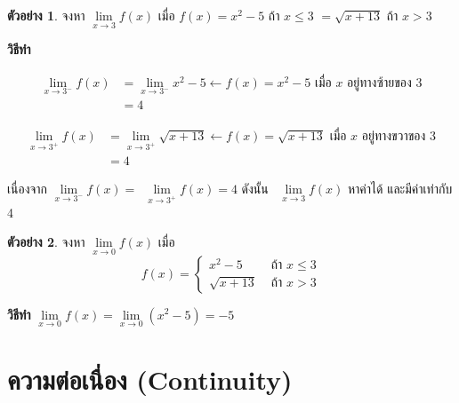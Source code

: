\documentclass[
]{book}
\theoremstyle{definition}
\theoremstyle{definition}
\newtheorem{example}{ตัวอย่าง}[chapter]
\theoremstyle{definition}
\theoremstyle{definition}
\theoremstyle{remark}
\begin{document}
\begin{example}
\protect\hypertarget{exm:ex-limit-10}{}\label{exm:ex-limit-10}จงหา \(\underset{x\rightarrow 3}{\lim}f\left( x\right)\) เมื่อ
\(f\left( x\right) =x^{2}-5\) ถ้า \(x\leq 3\) \(=\sqrt{x+13}\) ถ้า \(x>3\)
\end{example}

\textbf{วิธีทำ}

\begin{equation}
  \begin{aligned}
    \underset{x\rightarrow 3^{-}}{\lim}f\left( x\right)
    &=\underset{x\rightarrow 3^{-}}{\lim}x^{2}-5 \leftarrow \boxed{  f(x) = x^{2}-5  \mbox{ เมื่อ $x$ อยู่ทางซ้ายของ 3}}\\
    &=4
  \end{aligned}
\end{equation}

\begin{equation}
  \begin{aligned}
    \underset{x\rightarrow 3^{+}}{\lim}f\left( x\right)
        &= \underset{x\rightarrow 3^{+}}{\lim}\sqrt{x+13} \leftarrow
        \boxed{ f(x)=\sqrt{x+13} \mbox{ เมื่อ $x$ อยู่ทางขวาของ 3}} \\
        &=4
  \end{aligned}
\end{equation}

เนื่องจาก
\(\underset{x\rightarrow 3^{-}}{\lim}f\left( x\right) =\)~\(\underset{x\rightarrow 3^{+}}{\lim}f\left( x\right) =4\)
ดังนั้น ~\(\underset{x\rightarrow 3}{\lim}f\left( x\right)\) หาค่าได้
และมีค่าเท่ากับ 4

\begin{example}
\protect\hypertarget{exm:ex-limit-11}{}\label{exm:ex-limit-11}จงหา \(\underset{x\rightarrow 0}{\lim}f\left( x\right)\) เมื่อ
\[f(x) = \begin{cases}
            x^{2}-5 & \text{ ถ้า } x\leq 3 \\
            \sqrt{x+13}  & \text{ ถ้า } x>3
              \end{cases}\]
\end{example}

\textbf{วิธีทำ} \(\underset{x\rightarrow 0}{\lim}f(x)=\underset{x\rightarrow 0}{\lim}(x^{2}-5)=-5\)

\section{ความต่อเนื่อง (Continuity)}\label{uxe04uxe27uxe32uxe21uxe15uxe2duxe40uxe19uxe2duxe07-continuity}
\end{document}
